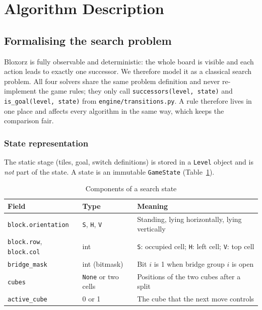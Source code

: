 \section{Algorithm Description}

\subsection{Formalising the search problem}

Bloxorz is fully observable and deterministic: the whole board is visible and each action
leads to exactly one successor. We therefore model it as a classical search problem. All four
solvers share the same problem definition and never re-implement the game rules; they only call
\texttt{successors(level, state)} and \texttt{is\_goal(level, state)} from
\texttt{engine/transitions.py}. A rule therefore lives in one place and affects every algorithm
in the same way, which keeps the comparison fair.

\subsubsection{State representation}

The static stage (tiles, goal, switch definitions) is stored in a \texttt{Level} object and is
\emph{not} part of the state. A state is an immutable \texttt{GameState}
(Table~\ref{tab:state}).

\begin{table}[H]
\centering
\caption{Components of a search state}
\label{tab:state}
\begin{tabularx}{\linewidth}{llX}
\toprule
\textbf{Field} & \textbf{Type} & \textbf{Meaning} \\
\midrule
\texttt{block.orientation} & \texttt{S}, \texttt{H}, \texttt{V} & Standing, lying horizontally, lying vertically \\
\texttt{block.row}, \texttt{block.col} & int & \texttt{S}: occupied cell; \texttt{H}: left cell; \texttt{V}: top cell \\
\texttt{bridge\_mask} & int (bitmask) & Bit $i$ is 1 when bridge group $i$ is open \\
\texttt{cubes} & \texttt{None} or two cells & Positions of the two cubes after a split \\
\texttt{active\_cube} & 0 or 1 & The cube that the next move controls \\
\bottomrule
\end{tabularx}
\end{table}


